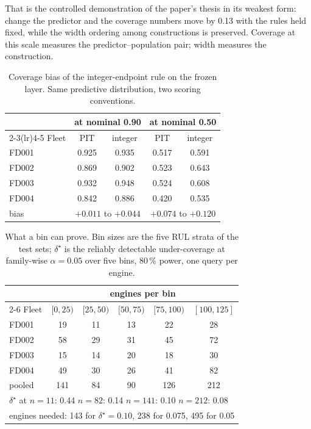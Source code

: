 \documentclass[journal]{IEEEtran}
\newcommand{\dx}{\delta^{\star}}
\begin{document}
That is the controlled demonstration of the paper's thesis in its weakest form: change the
predictor and the coverage numbers move by 0.13 with the rules held fixed, while the width
ordering among constructions is preserved. Coverage at this scale measures the
predictor--population pair; width measures the construction.

\begin{table}[t]
\centering
\caption{Coverage bias of the integer-endpoint rule on the frozen layer. Same predictive
distribution, two scoring conventions.}
\label{tab:convention}
\begin{tabular}{lcccc}
\toprule
 & \multicolumn{2}{c}{at nominal 0.90} & \multicolumn{2}{c}{at nominal 0.50}\\
\cmidrule(lr){2-3}\cmidrule(lr){4-5}
Fleet & PIT & integer & PIT & integer\\
\midrule
FD001 & 0.925 & 0.935 & 0.517 & 0.591\\
FD002 & 0.869 & 0.902 & 0.523 & 0.643\\
FD003 & 0.932 & 0.948 & 0.524 & 0.608\\
FD004 & 0.842 & 0.886 & 0.420 & 0.535\\
\midrule
bias & \multicolumn{2}{c}{$+0.011$ to $+0.044$} & \multicolumn{2}{c}{$+0.074$ to $+0.120$}\\
\bottomrule
\end{tabular}
\end{table}

\begin{table}[t]
\centering
\caption{What a bin can prove. Bin sizes are the five RUL strata of the test sets; $\dx$ is the
reliably detectable under-coverage at family-wise $\alpha=0.05$ over five bins, 80\,\% power,
one query per engine.}
\label{tab:detect}
\begin{tabular}{lccccc}
\toprule
 & \multicolumn{5}{c}{engines per bin}\\
\cmidrule(lr){2-6}
Fleet & $[0,25)$ & $[25,50)$ & $[50,75)$ & $[75,100)$ & $[100,125]$\\
\midrule
FD001 & 19 & 11 & 13 & 22 & 28\\
FD002 & 58 & 29 & 31 & 45 & 72\\
FD003 & 15 & 14 & 20 & 18 & 30\\
FD004 & 49 & 30 & 26 & 41 & 82\\
pooled & 141 & 84 & 90 & 126 & 212\\
\midrule
\multicolumn{6}{l}{$\dx$ at $n=11$: 0.44 \quad $n=82$: 0.14 \quad $n=141$: 0.10 \quad $n=212$: 0.08}\\
\multicolumn{6}{l}{engines needed: 143 for $\dx=0.10$, 238 for 0.075, 495 for 0.05}\\
\bottomrule
\end{tabular}
\end{table}
\end{document}
